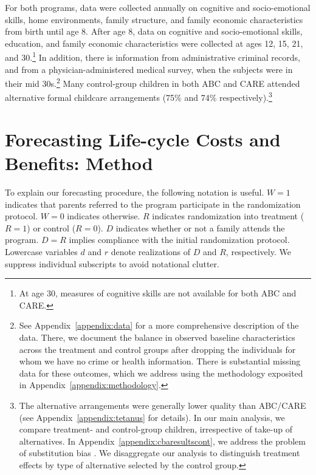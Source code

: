 For both programs, data were collected annually on cognitive and socio-emotional skills, home environments, family structure, and family economic characteristics from birth until age 8. After age 8, data on cognitive and socio-emotional skills, education, and family economic characteristics were collected at ages 12, 15, 21, and 30.\footnote{At age 30, measures of cognitive skills are not available for both ABC and CARE.} In addition, there is information from administrative criminal records, and from a physician-administered medical survey, when the subjects were in their mid 30s.\footnote{See  Appendix~\ref{appendix:data} for a more comprehensive description of the data. There, we document the balance in observed baseline characteristics across the treatment and control groups after dropping the individuals for whom we have no crime or health information. There is substantial missing data for these outcomes, which we address using the methodology exposited in Appendix~\ref{appendix:methodology}.} Many control-group children in both ABC and CARE attended alternative formal childcare arrangements (75\% and 74\% respectively).\footnote{The alternative arrangements were generally lower quality than ABC/CARE (see Appendix~\ref{appendix:tetanus} for details). In our main analysis, we compare treatment- and control-group children, irrespective of take-up of alternatives. In Appendix~\ref{appendix:cbaresultscont}, we address the problem of substitution bias \citep{Heckman_1992_randomization,Heckman_Hohmann_etal_2000_QJE,Kline_Walters_2016_QJE}. We disaggregate our analysis to distinguish treatment effects by type of alternative selected by the control group.}

\section{Forecasting Life-cycle Costs and Benefits: Method} \label{section:cbamethodology}

\noindent To explain our forecasting procedure, the following notation is useful. $W=1$ indicates that parents referred to the program participate in the randomization protocol. $W=0$ indicates otherwise. $R$ indicates randomization into treatment ($R = 1$) or control ($R = 0$). $D$ indicates whether or not a family attends the program. $D= R$ implies compliance with the initial randomization protocol. Lowercase variables $d$ and $r$ denote realizations of $D$ and $R$, respectively. We suppress individual subscripts to avoid notational clutter.

